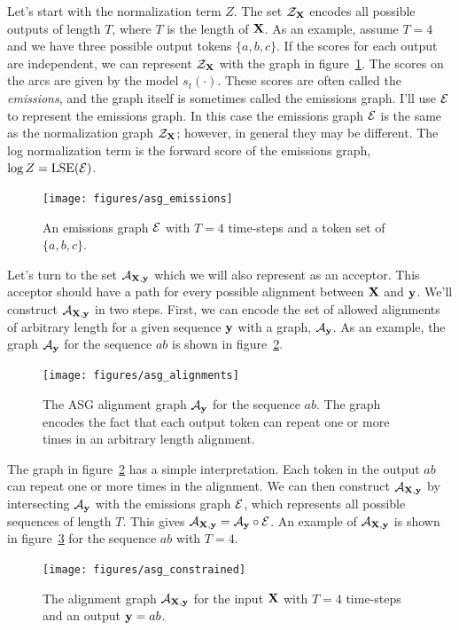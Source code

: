 Let's start with the normalization term $Z$. The set $\mathcal{Z}_{\bf X}$ encodes all
possible outputs of length $T$, where $T$ is the length of ${\bf X}$. As an
example, assume $T=4$ and we have three possible output tokens $\{a, b, c\}$.
If the scores for each output are independent, we can represent $\mathcal{Z}_{\bf X}$ with
the graph in figure~\ref{fig:asg_emissions}. The scores on the arcs are given
by the model $s_t(\cdot)$.  These scores are often called the \emph{emissions},
and the graph itself is sometimes called the emissions graph. I'll use $\mathcal{E}$ to
represent the emissions graph. In this case the emissions graph $\mathcal{E}$ is the
same as the normalization graph $\mathcal{Z}_{\bf X}$; however, in general they may be
different. The log normalization term is the forward score of the emissions
graph, $\log Z = \operatorname*{\textrm{LSE}}(\mathcal{E})$.

\begin{figure}
    \centering
    \texttt{[image: figures/asg\_emissions]}
    \caption{An emissions graph $\mathcal{E}$ with $T=4$ time-steps and a token set of
    $\{a, b, c\}$.}
    \label{fig:asg_emissions}
\end{figure}

Let's turn to the set $\mathcal{A}_{{\bf X}, {\bf y}}$ which we will also represent as an
acceptor. This acceptor should have a path for every possible alignment between
${\bf X}$ and ${\bf y}$. We'll construct $\mathcal{A}_{{\bf X}, {\bf y}}$ in two steps. First, we can
encode the set of allowed alignments of arbitrary length for a given sequence
${\bf y}$ with a graph, $\mathcal{A}_{\bf y}$. As an example, the graph $\mathcal{A}_{\bf y}$ for the
sequence $ab$ is shown in figure~\ref{fig:asg_alignments}.

\begin{figure}
    \centering
    \texttt{[image: figures/asg\_alignments]}
    \caption{The ASG alignment graph $\mathcal{A}_{\bf y}$ for the sequence $ab$. The graph
    encodes the fact that each output token can repeat one or more times in an
    arbitrary length alignment.}
    \label{fig:asg_alignments}
\end{figure}

The graph in figure~\ref{fig:asg_alignments} has a simple interpretation. Each
token in the output $ab$ can repeat one or more times in the alignment. We can
then construct $\mathcal{A}_{{\bf X},{\bf y}}$ by intersecting $\mathcal{A}_{\bf y}$ with the emissions
graph $\mathcal{E}$, which represents all possible sequences of length $T$. This gives
$\mathcal{A}_{{\bf X},{\bf y}} = \mathcal{A}_{\bf y} \circ \mathcal{E}$. An example of $\mathcal{A}_{{\bf X}, {\bf y}}$ is shown in
figure~\ref{fig:asg_constrained} for the sequence $ab$ with $T=4$.

\begin{figure}
    \centering
    \texttt{[image: figures/asg\_constrained]}
    \caption{The alignment graph $\mathcal{A}_{{\bf X}, {\bf y}}$ for the input ${\bf X}$ with
    $T=4$ time-steps and an output ${\bf y} = ab$.}
    \label{fig:asg_constrained}
\end{figure}


